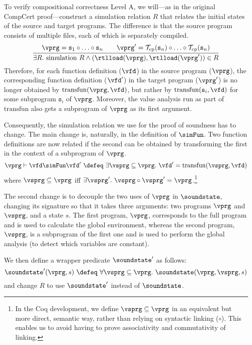 To verify compositional correctness Level A, we will---as in the
original CompCert proof---construct a simulation relation $R$ that
relates the initial states of the source and target programs.  The
difference is that the source program consists of multiple files, each
of which is separately compiled.
\[
\frac{
\begin{array}{@{}c@{}}
\vprg = \mathtt{s}_1\circ \ldots \circ \mathtt{s}_n \qquad
\vprg' = \mathcal{T}_\mathrm{cp}(\mathtt{s}_n)\circ \ldots \circ \mathcal{T}_\mathrm{cp}(\mathtt{s}_n)
\end{array}
}
{\exists R.~ \mathrm{simulation}~R \land (\rtlload(\vprg),\rtlload(\vprg'))\in R
}
\]
Therefore, for each function definition ($\vfd$) in the source program
($\vprg$), the corresponding function definition ($\vfd'$) in the
target program ($\vprg'$) is no longer obtained by
$\mathrm{transfun}(\vprg,\vfd)$, but rather by
$\mathrm{transfun}(\mathtt{s}_i,\vfd)$ for some subprogram
$\mathtt{s}_i$ of $\vprg$.  Moreover, the value analysis run as part
of $\mathrm{transfun}$ also gets a subprogram of $\vprg$ as its first
argument.

Consequently, the simulation relation we use for the proof of soundness has to change.
The main change is, naturally, in the definition of $\simFun$.
Two function definitions are now related if the second can be obtained by transforming the first in the context of a subprogram of $\vprg$.
\[ 
\vprg \vdash \vfd \simFun \vfd' ~\defeq~ \exists \vsprg \subseteq \vprg.~ \vfd' = \mathrm{transfun}(\vsprg,\vfd)
\]
where $\vsprg \subseteq \vprg$ iff $\exists \vsprg'.~\vsprg \circ
\vsprg' = \vprg$.\footnote{In the Coq development, we define $\vsprg
  \subseteq \vprg$ in an equivalent but more direct, semantic way,
  rather than relying on syntactic linking ($\circ$).  This enables us
  to avoid having to prove associativity and commutativity of
  linking.}

The second change is to decouple the two uses of $\vprg$ in $\soundstate$,
changing its signature so that it takes three arguments: two programs $\vprg$ and $\vsprg$, and a state $s$.
The first program, $\vprg$, corresponds to the full program and is used to calculate the global environment,
whereas the second program, $\vsprg$, is a subprogram of the first one and is used to perform the global analysis
(\ie to detect which variables are constant). 

We then define a wrapper predicate $\soundstate'$ as follows:
\[
\soundstate'(\vprg,s) ~\defeq~ 
  \forall \vsprg \subseteq \vprg.~ \soundstate(\vprg,\vsprg,s)
\]
and change $R$ to use $\soundstate'$ instead of $\soundstate$.

